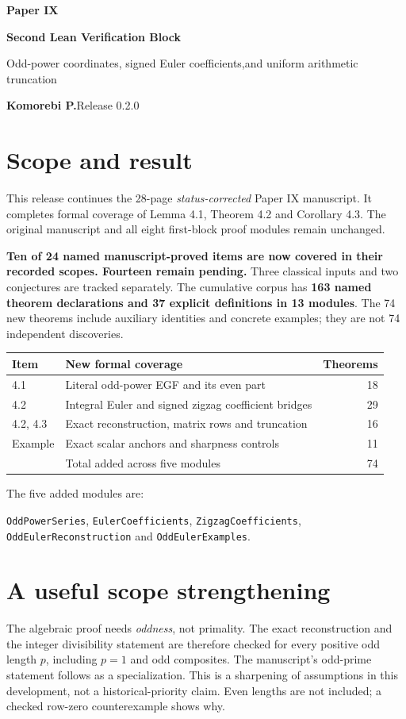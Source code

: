 \documentclass[11pt]{article}
\begin{document}
{\LARGE\bfseries\color{ink}Paper IX}\par
{\Large\bfseries Second Lean Verification Block}\par
{\large Odd-power coordinates, signed Euler coefficients,\newline and uniform arithmetic truncation}\par
\textbf{Komorebi P.}\hfill Release 0.2.0
\bigskip
\section*{Scope and result}
This release continues the 28-page \emph{status-corrected} Paper IX manuscript. It completes formal coverage of Lemma 4.1, Theorem 4.2 and Corollary 4.3. The original manuscript and all eight first-block proof modules remain unchanged.

\textbf{Ten of 24 named manuscript-proved items are now covered in their recorded scopes. Fourteen remain pending.} Three classical inputs and two conjectures are tracked separately. The cumulative corpus has \textbf{163 named theorem declarations and 37 explicit definitions in 13 modules}. The 74 new theorems include auxiliary identities and concrete examples; they are not 74 independent discoveries.

\begin{center}
\begin{tabular}{@{}p{}p{}r@{}}
\toprule
Item & New formal coverage & Theorems\\\midrule
4.1 & Literal odd-power EGF and its even part & 18\\
4.2 & Integral Euler and signed zigzag coefficient bridges & 29\\
4.2, 4.3 & Exact reconstruction, matrix rows and truncation & 16\\
Example & Exact scalar anchors and sharpness controls & 11\\\midrule
 & Total added across five modules & 74\\\bottomrule
\end{tabular}
\end{center}
The five added modules are:\par
{\small\texttt{OddPowerSeries}, \texttt{EulerCoefficients}, \texttt{ZigzagCoefficients},\newline
\texttt{OddEulerReconstruction} and \texttt{OddEulerExamples}.}

\section*{A useful scope strengthening}
The algebraic proof needs \emph{oddness}, not primality. The exact reconstruction and the integer divisibility statement are therefore checked for every positive odd length $p$, including $p=1$ and odd composites. The manuscript's odd-prime statement follows as a specialization. This is a sharpening of assumptions in this development, not a historical-priority claim. Even lengths are not included; a checked row-zero counterexample shows why.
\end{document}
